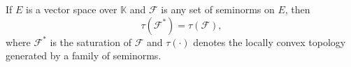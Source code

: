 If $E$ is a vector space over $\mathbb{K}$ and $\mathcal{F}$ is any set of seminorms on $E$, then
$$\tau(\mathcal{F}^*) = \tau(\mathcal{F}),$$
where $\mathcal{F}^*$ is the saturation of $\mathcal{F}$ and $\tau(\cdot)$ denotes the locally convex topology generated by a family of seminorms.
